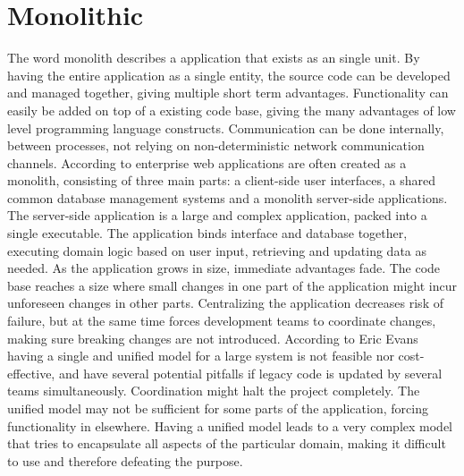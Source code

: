 \section{Monolithic}
The word monolith describes a application that exists as an single unit. By having the entire application as a single entity, the source code can be developed and managed together, giving multiple short term advantages\cite[p.~68]{long2017cloud}. Functionality can easily be added on top of a existing code base, giving the many advantages of low level programming language constructs. Communication can be done internally, between processes, not relying on non-deterministic network communication channels. 
According to \citeauthor{fowler2014microservices} enterprise web applications are often created as a monolith, consisting of three main parts: a client-side user interfaces, a shared common database management systems and a monolith server-side applications. The server-side application is a large and complex application, packed into a single executable. The application binds interface and database together, executing domain logic based on user input, retrieving and updating data as needed. 
As the application grows in size, immediate advantages fade. The code base reaches a size where small changes in one part of the application might incur unforeseen changes in other parts. Centralizing the application decreases risk of failure, but at the same time forces development teams to coordinate changes, making sure breaking changes are not introduced\cite[p.~68]{long2017cloud}. 
According to Eric Evans having a single and unified model for a large system is not feasible nor cost-effective, and have several potential pitfalls if legacy code is updated by several teams simultaneously. Coordination might halt the project completely. The unified model may not be sufficient for some parts of the application, forcing functionality in elsewhere. Having a unified model leads to a very complex model that tries to encapsulate all aspects of the particular domain, making it difficult to use and therefore defeating the purpose\cite[p.~331]{evans2004domain}.

